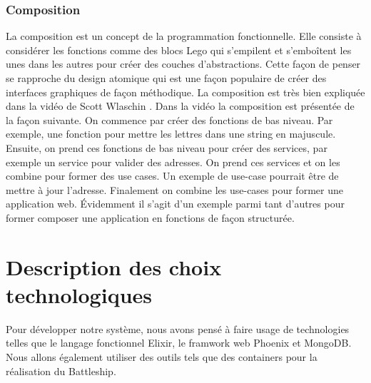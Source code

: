 \documentclass[12pt]{article}
\begin{document}
\subsubsection{Composition}

La composition est un concept de la programmation fonctionnelle. Elle consiste à considérer les fonctions comme des blocs Lego qui s'empilent et s'emboîtent les unes dans les autres pour créer des couches d'abstractions. Cette façon de penser se rapproche du design atomique \cite{Atomic_Design} qui est une façon populaire de créer des interfaces graphiques de façon méthodique. La composition est très bien expliquée dans la vidéo de Scott Wlaschin \cite{functional_video}. Dans la vidéo la composition est présentée de la façon suivante. On commence par créer des fonctions de bas niveau. Par exemple, une fonction pour mettre les lettres dans une string en majuscule. Ensuite, on prend ces fonctions de bas niveau pour créer des services, par exemple un service pour valider des adresses. On prend ces services et on les combine pour former des use cases. Un exemple de use-case pourrait être de mettre à jour l'adresse. Finalement on combine les use-cases pour former une application web. Évidemment il s'agit d'un exemple parmi tant d'autres pour former composer une application en fonctions de façon structurée.

\section{Description des choix technologiques} 

Pour développer notre système, nous avons pensé à faire usage de technologies telles que le langage fonctionnel Elixir, le framwork web Phoenix et MongoDB. Nous allons également utiliser des outils tels que des containers pour la réalisation du Battleship.
\end{document}
